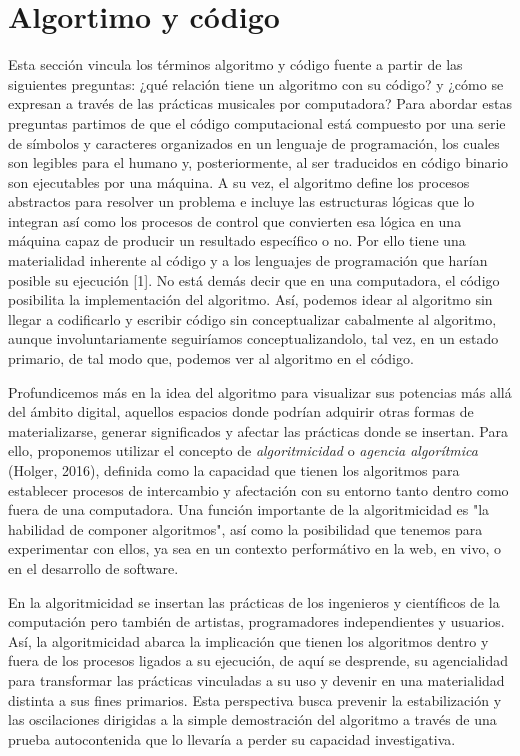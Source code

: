 \section{Algortimo y código}
Esta sección vincula los términos algoritmo y código fuente a partir de las siguientes preguntas: ¿qué relación tiene un algoritmo con su código? y ¿cómo se expresan a través de las prácticas musicales por computadora? Para abordar estas preguntas partimos de que el código computacional está compuesto por una serie de símbolos y caracteres organizados en un lenguaje de programación, los cuales son legibles para el humano y, posteriormente, al ser traducidos en código binario son ejecutables por una máquina. A su vez, el algoritmo define los procesos abstractos para resolver un problema e incluye las estructuras lógicas que lo integran así como los procesos de control que convierten esa lógica en una máquina capaz de producir un resultado específico o no. Por ello tiene una materialidad inherente al código y a los lenguajes de programación que harían posible su ejecución [1]. No está demás decir que en una computadora, el código posibilita la implementación del algoritmo. Así, podemos idear al algoritmo sin llegar a codificarlo y escribir código sin conceptualizar cabalmente al algoritmo, aunque involuntariamente seguiríamos conceptualizandolo, tal vez, en un estado primario, de tal modo que, podemos ver al algoritmo en el código.

Profundicemos más en la idea del algoritmo para visualizar sus potencias más allá del ámbito digital, aquellos espacios donde podrían adquirir otras formas de materializarse, generar significados y afectar las prácticas donde se insertan. Para ello, proponemos utilizar el concepto de \emph{ algoritmicidad} o \emph{agencia algorítmica} (Holger, 2016), definida como la capacidad que tienen los algoritmos para establecer procesos de intercambio y afectación con su entorno tanto dentro como fuera de una computadora. Una función importante de la algoritmicidad es "la habilidad de componer algoritmos", así como la posibilidad que tenemos para experimentar con ellos, ya sea en un contexto performátivo en la web, en vivo, o en el desarrollo de software.

En la algoritmicidad se insertan las prácticas de los ingenieros y científicos de la computación pero también de artistas, programadores independientes y usuarios. Así, la algoritmicidad abarca la implicación que tienen los algoritmos dentro y fuera de los procesos ligados a su ejecución, de aquí se desprende, su agencialidad para transformar las prácticas vinculadas a su uso y devenir en una materialidad distinta a sus fines primarios. Esta perspectiva busca prevenir la estabilización y las oscilaciones dirigidas a la simple demostración del algoritmo a través de una prueba autocontenida que lo llevaría a perder su capacidad investigativa.

